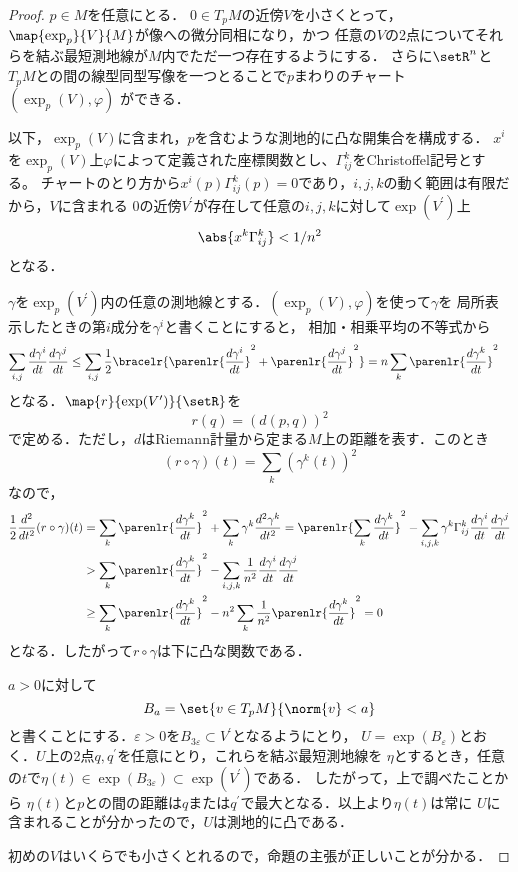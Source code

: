 \documentclass[uplatex]{jsarticle}
\begin{document}
\begin{proof}
  $p\in M$を任意にとる．
  $0\in T_pM$の近傍$V$を小さくとって，$\map{\exp_p}{V}{M}$が像への微分同相になり，かつ
  任意の$V$の2点についてそれらを結ぶ最短測地線が$M$内でただ一つ存在するようにする．
  さらに$\setR^n$と$T_p M$との間の線型同型写像を一つとることで$p$まわりのチャート$(\exp_p(V), \varphi)$
  ができる．
  
  以下，$\exp_p(V)$に含まれ，$p$を含むような測地的に凸な開集合を構成する．
  $x^i$を$\exp_p(V)$上$\varphi$によって定義された座標関数とし、$\Gamma_{ij}^k$をChristoffel記号とする。
  チャートのとり方から$x^i(p)\Gamma_{ij}^k(p) = 0$であり，$i, j, k$の動く範囲は有限だから，$V$に含まれる
  0の近傍$V^\prime$が存在して任意の$i, j, k$に対して$\exp(V^\prime)$上
    \[\abs{x^k\Gamma_{ij}^k} < 1 / n^2 \]
  となる．

  $\gamma$を$\exp_p(V^\prime)$内の任意の測地線とする．$(\exp_p(V),\varphi)$を使って$\gamma$を
  局所表示したときの第$i$成分を$\gamma^i$と書くことにすると，
  相加・相乗平均の不等式から
  \begin{align*}
    \sum_{i, j} \frac{d\gamma^i}{dt} \frac{d\gamma^j}{dt} 
      &\leq \sum_{i, j} \frac{1}{2} \bracelr{\parenlr{\frac{d\gamma^i}{dt}}^2 + 
      \parenlr{\frac{d\gamma^j}{dt}}^2} = n\sum_k \parenlr{\frac{d\gamma^k}{dt}}^2
  \end{align*}
  となる．$\map{r}{\exp(V^\prime)}{\setR}$を
    \[r(q) = (d(p,q))^2 \]
  で定める．ただし，$d$はRiemann計量から定まる$M$上の距離を表す．このとき
  \[(r\circ \gamma)(t) = \sum_k (\gamma^k(t))^2\]
  なので，
  \begin{align*}
    \frac{1}{2}\frac{d^2}{dt^2}(r\circ \gamma)(t)
      &= \sum_k \parenlr{\frac{d\gamma^k}{dt}}^2 + \sum_k \gamma^k \frac{d^2\gamma^k}{dt^2} 
      = \parenlr{\sum_k\frac{d\gamma^k}{dt}}^2 - \sum_{i, j, k} \gamma^k \Gamma_{ij}^k\frac{d\gamma^i}{dt}\frac{d\gamma^j}{dt} \\
    &> \sum_k \parenlr{\frac{d\gamma^k}{dt}}^2 
      - \sum_{i,j,k} \frac{1}{n^2}\frac{d\gamma^i}{dt}\frac{d\gamma^j}{dt} \\
    &\geq \sum_k \parenlr{\frac{d\gamma^k}{dt}}^2 - n^2\sum_k\frac{1}{n^2}\parenlr{\frac{d\gamma^k}{dt}}^2  = 0
  \end{align*}
  となる．したがって$r\circ \gamma$は下に凸な関数である．
  
  $a>0$に対して
    \[B_a = \set{v\in T_p M}{\norm{v} < a} \]
  と書くことにする．$\varepsilon>0$を$B_{3\varepsilon} \subset V^\prime$となるようにとり，
  $U = \exp(B_\varepsilon)$とおく．$U$上の2点$q, q^\prime$を任意にとり，これらを結ぶ最短測地線を
  $\eta$とするとき，任意の$t$で$\eta(t)\in \exp(B_{3\varepsilon})\subset \exp(V^\prime)$である．
  したがって，上で調べたことから
  $\eta(t)$と$p$との間の距離は$q$または$q^\prime$で最大となる．以上より$\eta(t)$は常に
  $U$に含まれることが分かったので，$U$は測地的に凸である．

  初めの$V$はいくらでも小さくとれるので，命題の主張が正しいことが分かる．
\end{proof}
\end{document}

